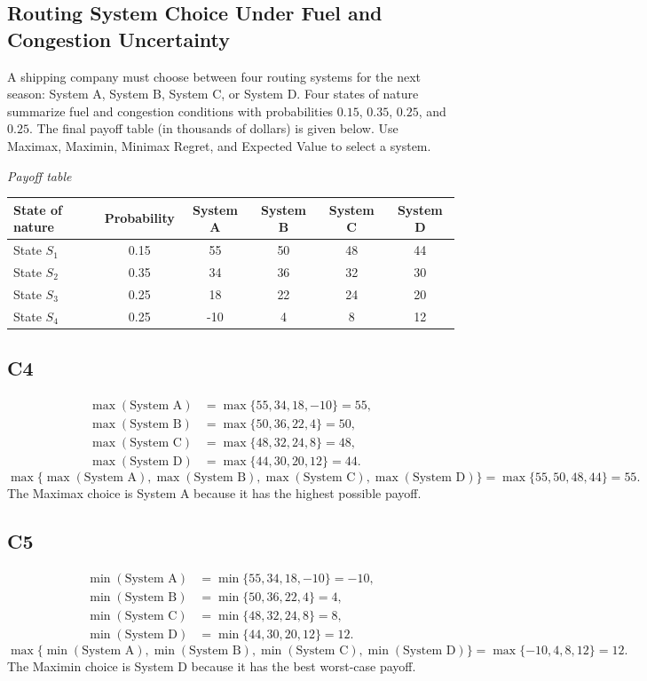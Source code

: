 \begin{ExamProblems}
		\section{Routing System Choice Under Fuel and Congestion Uncertainty}
		A shipping company must choose between four routing systems for the next season: System A, System B,
		System C, or System D. Four states of nature summarize fuel and congestion conditions
		with probabilities $0.15$, $0.35$, $0.25$, and $0.25$. The final payoff table (in thousands of dollars)
		is given below. Use Maximax, Maximin, Minimax Regret, and Expected Value to select a system.
		
		\begin{center}
			\textit{Payoff table} \\
			\begin{tabular}{l c c c c c}
				\toprule
				State of nature & Probability & System A & System B & System C & System D \\
				\midrule
				State $S_1$ & 0.15 & 55 & 50 & 48 & 44 \\
				State $S_2$ & 0.35 & 34 & 36 & 32 & 30 \\
				State $S_3$ & 0.25 & 18 & 22 & 24 & 20 \\
				State $S_4$ & 0.25 & -10 & 4 & 8 & 12 \\
				\bottomrule
			\end{tabular}
		\end{center}
		
		\subsection*{C4}
		\[
		\begin{aligned}
		\max(\text{System A}) &= \max\{55,34,18,-10\} = 55,\\
		\max(\text{System B}) &= \max\{50,36,22,4\} = 50,\\
		\max(\text{System C}) &= \max\{48,32,24,8\} = 48,\\
		\max(\text{System D}) &= \max\{44,30,20,12\} = 44.
		\end{aligned}
		\]
		\[
		\max\{\max(\text{System A}), \max(\text{System B}), \max(\text{System C}), \max(\text{System D})\}
		= \max\{55, 50, 48, 44\}
		= 55.
		\]
		The Maximax choice is System A because it has the highest possible payoff.
		
		\subsection*{C5}
		\[
		\begin{aligned}
		\min(\text{System A}) &= \min\{55,34,18,-10\} = -10,\\
		\min(\text{System B}) &= \min\{50,36,22,4\} = 4,\\
		\min(\text{System C}) &= \min\{48,32,24,8\} = 8,\\
		\min(\text{System D}) &= \min\{44,30,20,12\} = 12.
		\end{aligned}
		\]
		\[
		\max\{\min(\text{System A}), \min(\text{System B}), \min(\text{System C}), \min(\text{System D})\}
		= \max\{-10, 4, 8, 12\}
		= 12.
		\]
		The Maximin choice is System D because it has the best worst-case payoff.
		

\end{ExamProblems}
